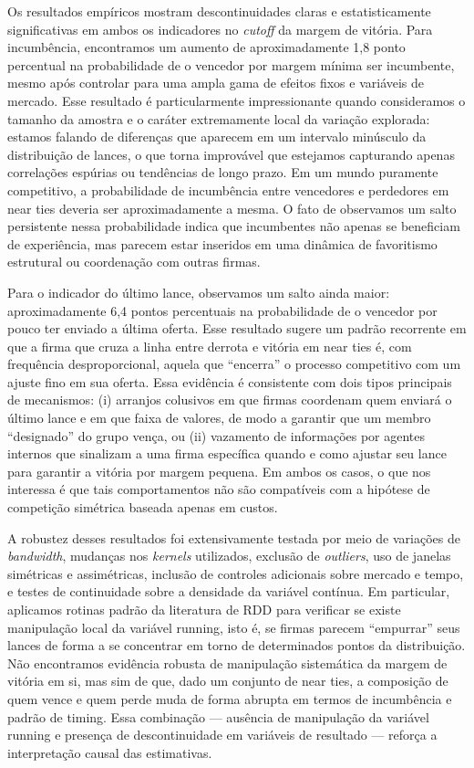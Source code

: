 \documentclass[12pt,a4paper]{article}
\begin{document}
Os resultados empíricos mostram descontinuidades claras e estatisticamente significativas em ambos os indicadores no \textit{cutoff} da margem de vitória. Para incumbência, encontramos um aumento de aproximadamente 1,8 ponto percentual na probabilidade de o vencedor por margem mínima ser incumbente, mesmo após controlar para uma ampla gama de efeitos fixos e variáveis de mercado. Esse resultado é particularmente impressionante quando consideramos o tamanho da amostra e o caráter extremamente local da variação explorada: estamos falando de diferenças que aparecem em um intervalo minúsculo da distribuição de lances, o que torna improvável que estejamos capturando apenas correlações espúrias ou tendências de longo prazo. Em um mundo puramente competitivo, a probabilidade de incumbência entre vencedores e perdedores em near ties deveria ser aproximadamente a mesma. O fato de observamos um salto persistente nessa probabilidade indica que incumbentes não apenas se beneficiam de experiência, mas parecem estar inseridos em uma dinâmica de favoritismo estrutural ou coordenação com outras firmas.

Para o indicador do último lance, observamos um salto ainda maior: aproximadamente 6,4 pontos percentuais na probabilidade de o vencedor por pouco ter enviado a última oferta. Esse resultado sugere um padrão recorrente em que a firma que cruza a linha entre derrota e vitória em near ties é, com frequência desproporcional, aquela que ``encerra'' o processo competitivo com um ajuste fino em sua oferta. Essa evidência é consistente com dois tipos principais de mecanismos: (i) arranjos colusivos em que firmas coordenam quem enviará o último lance e em que faixa de valores, de modo a garantir que um membro ``designado'' do grupo vença, ou (ii) vazamento de informações por agentes internos que sinalizam a uma firma específica quando e como ajustar seu lance para garantir a vitória por margem pequena. Em ambos os casos, o que nos interessa é que tais comportamentos não são compatíveis com a hipótese de competição simétrica baseada apenas em custos.

A robustez desses resultados foi extensivamente testada por meio de variações de \textit{bandwidth}, mudanças nos \textit{kernels} utilizados, exclusão de \textit{outliers}, uso de janelas simétricas e assimétricas, inclusão de controles adicionais sobre mercado e tempo, e testes de continuidade sobre a densidade da variável contínua. Em particular, aplicamos rotinas padrão da literatura de RDD para verificar se existe manipulação local da variável running, isto é, se firmas parecem ``empurrar'' seus lances de forma a se concentrar em torno de determinados pontos da distribuição. Não encontramos evidência robusta de manipulação sistemática da margem de vitória em si, mas sim de que, dado um conjunto de near ties, a composição de quem vence e quem perde muda de forma abrupta em termos de incumbência e padrão de timing. Essa combinação — ausência de manipulação da variável running e presença de descontinuidade em variáveis de resultado — reforça a interpretação causal das estimativas.
\end{document}
